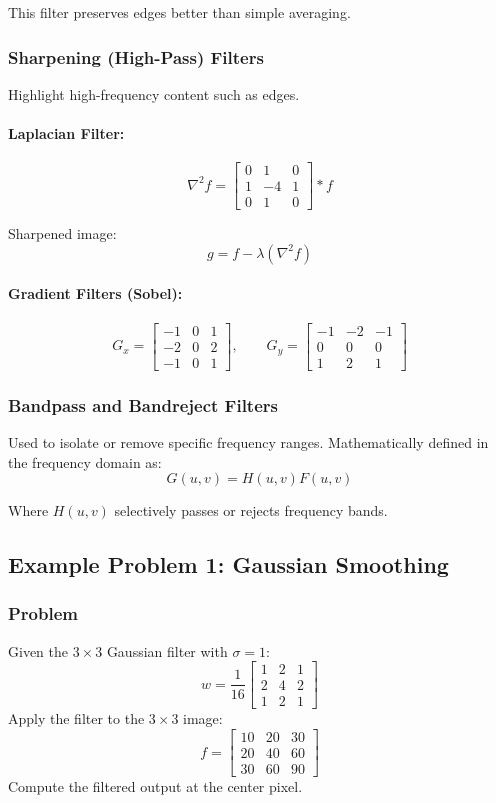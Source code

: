 \documentclass{AnantDocumentation}
\begin{document}
This filter preserves edges better than simple averaging.

\subsubsection{Sharpening (High-Pass) Filters}

Highlight high-frequency content such as edges.

\paragraph{Laplacian Filter:}
\[
\nabla^2 f = 
\begin{bmatrix}
0 & 1 & 0 \\
1 & -4 & 1 \\
0 & 1 & 0
\end{bmatrix} * f
\]

Sharpened image:
\[
g = f - \lambda (\nabla^2 f)
\]

\paragraph{Gradient Filters (Sobel):}
\[
G_x =
\begin{bmatrix}
-1 & 0 & 1\\
-2 & 0 & 2\\
-1 & 0 & 1
\end{bmatrix}, \qquad 
G_y =
\begin{bmatrix}
-1 & -2 & -1\\
0 & 0 & 0\\
1 & 2 & 1
\end{bmatrix}
\]

\subsubsection{Bandpass and Bandreject Filters}

Used to isolate or remove specific frequency ranges.  
Mathematically defined in the frequency domain as:
\[
G(u,v) = H(u,v)F(u,v)
\]

Where $H(u,v)$ selectively passes or rejects frequency bands.

\subsection{Example Problem 1: Gaussian Smoothing}

\subsubsection*{Problem}
Given the $3 \times 3$ Gaussian filter with $\sigma=1$:
\[
w = \frac{1}{16}
\begin{bmatrix}
1 & 2 & 1\\
2 & 4 & 2\\
1 & 2 & 1
\end{bmatrix}
\]
Apply the filter to the $3 \times 3$ image:
\[
f =
\begin{bmatrix}
10 & 20 & 30\\
20 & 40 & 60\\
30 & 60 & 90
\end{bmatrix}
\]
Compute the filtered output at the center pixel.
\end{document}
